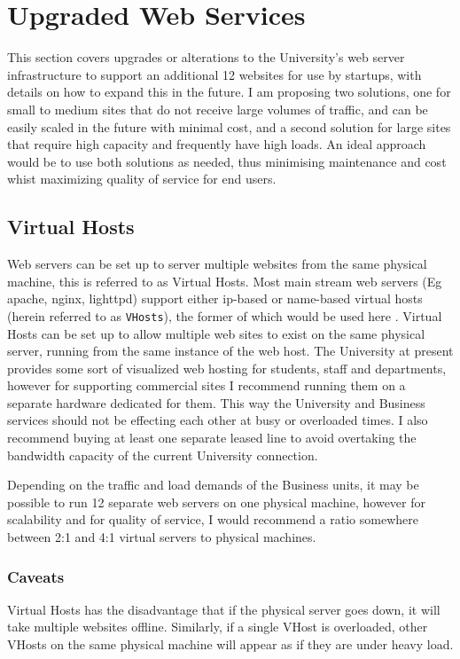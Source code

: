 \documentclass[10pt]{article}
\begin{document}
    \section{Upgraded Web Services}
        \label{sec:webServices}
        This section covers upgrades or alterations to the University's web server infrastructure to support an additional 12 websites for use by startups, with details on how to expand this in the future. I am proposing two solutions, one for small to medium sites that do not receive large volumes of traffic, and can be easily scaled in the future with minimal cost, and a second solution for large sites that require high capacity and frequently have high loads. An ideal approach would be to use both solutions as needed, thus minimising maintenance and cost whist  maximizing quality of service for end users.
        
        \subsection{Virtual Hosts}
            Web servers can be set up to server multiple websites from the same physical machine, this is referred to as Virtual Hosts. Most main stream web servers (Eg apache, nginx, lighttpd) support either ip-based or name-based virtual hosts (herein referred to as \texttt{VHosts}), the former of which would be used here \cite{cite:apacheVHosts}\cite{cite:nginxServerBlocks}\cite{cite:lighttpdVHosts}. Virtual Hosts can be set up to allow multiple web sites to exist on the same physical server, running from the same instance of the web host. The University at present provides some sort of visualized web hosting for students, staff and departments, however for supporting commercial sites I recommend running them on a separate hardware dedicated for them. This way the University and Business services should not be effecting each other at busy or overloaded times. I also recommend buying at least one separate leased line to avoid overtaking the bandwidth capacity of the current University connection. 

            Depending on the traffic and load demands of the Business units, it may be possible to run 12 separate web servers on one physical machine, however for scalability and for quality of service, I would recommend a ratio somewhere between 2:1 and 4:1 virtual servers to physical machines.

            \subsubsection{Caveats}
                Virtual Hosts has the disadvantage that if the physical server goes down, it will take multiple websites offline. Similarly, if a single VHost is overloaded, other VHosts on the same physical machine will appear as if they are under heavy load. 
\end{document}
